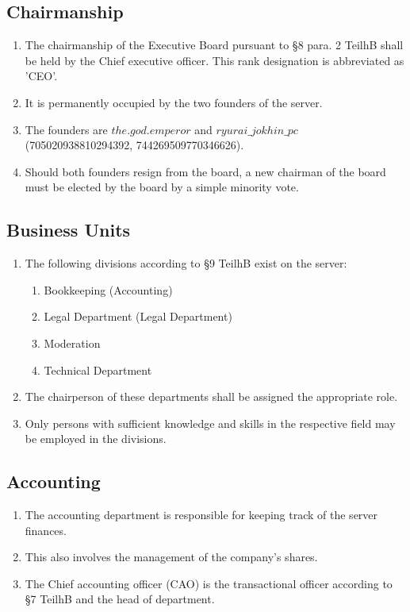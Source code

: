\documentclass{article}
\begin{document}
\subsection{Chairmanship}
\begin{enumerate}[(1)]
	\item The chairmanship of the Executive Board pursuant to §8 para. 2 TeilhB shall be held by the Chief executive officer. This rank designation is abbreviated as 'CEO'.
	\item It is permanently occupied by the two founders of the server.
	\item The founders are $the.god.emperor$ and $ryurai\_jokhin\_pc$ (705020938810294392, 744269509770346626).
	\item Should both founders resign from the board, a new chairman of the board must be elected by the board by a simple minority vote.
\end{enumerate}

\subsection{Business Units}
\begin{enumerate}[(1)]
	\item The following divisions according to §9 TeilhB exist on the server:
		\begin{enumerate}[(1)]
			\item Bookkeeping (Accounting)
			\item Legal Department (Legal Department)
			\item Moderation
			\item Technical Department
		\end{enumerate}
	\item The chairperson of these departments shall be assigned the appropriate role.
	\item Only persons with sufficient knowledge and skills in the respective field may be employed in the divisions.
\end{enumerate}

\subsection{Accounting}
\begin{enumerate}[(1)]
	\item The accounting department is responsible for keeping track of the server finances.
	\item This also involves the management of the company's shares.
	\item The Chief accounting officer (CAO) is the transactional officer according to §7 TeilhB and the head of department.
\end{enumerate}
\end{document}
